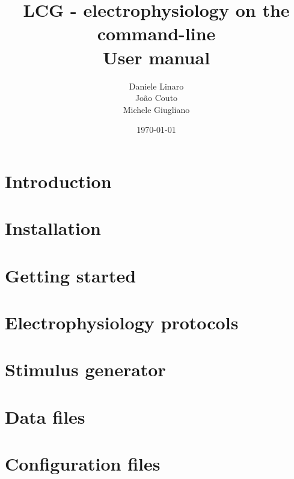 \documentclass[10pt,a4paper,twoside]{book}
\title{\textbf{LCG} - electrophysiology on the command-line \\ User manual}
\author{Daniele Linaro \\ Jo\~ao Couto \\ Michele Giugliano}
\date{\today}
\begin{document}
\maketitle
\thispagestyle{empty}

\dominitoc
\tableofcontents
\newpage
{}

\chapter{Introduction}
\label{chap:intro}


%

\chapter{Installation}
\label{chap:installation}


\chapter{Getting started}
\label{chap:start}


\chapter{Electrophysiology protocols}
\label{chap:protocols}


\chapter{Stimulus generator}
\label{chap:stimgen}


\chapter{Data files}
\label{chap:datafiles}


\chapter{Configuration files}
\label{chap:configuration}

\end{document}

